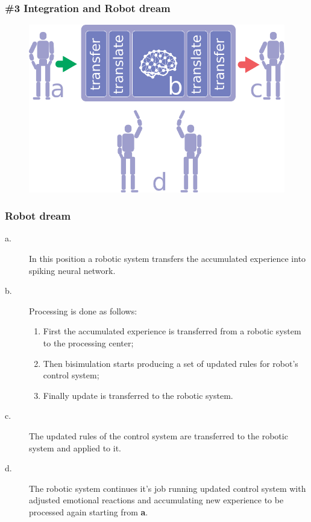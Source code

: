 \documentclass[12pt, aspectratio=169]{beamer}
\begin{document}
\begin{frame}
\frametitle{\#3 Integration and Robot dream}
\begin{figure}
\includegraphics[width=0.8\linewidth]{robot-dream}
\end{figure}
\end{frame}


\begin{frame}
\frametitle{Robot dream}
\begin{description}
  \item[a.] In this position a robotic system transfers the accumulated experience into spiking neural network.
  \item[b.] Processing is done as follows:
      \begin{enumerate}
      \item First the accumulated experience is transferred from a robotic system to the processing center;
      \item Then bisimulation starts producing a set of updated rules for robot's control system;
      \item Finally update is transferred to the robotic system.
      \end{enumerate}
  \item[c.] The updated rules of the control system are transferred to the robotic system and applied to it.
  \item[d.] The robotic system continues it's job running updated control system with adjusted emotional reactions
            and accumulating new experience to be processed again starting from \textbf{a}.
  \end{description}
\end{frame}

\end{document}
